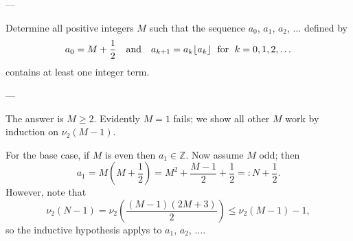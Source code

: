 
---

Determine all positive integers $M$ such that the sequence $a_0$, $a_1$, $a_2$, $\ldots$ defined by
\[a_0=M+\frac12\quad\text{and}\quad a_{k+1}=a_k\lfloor a_k\rfloor\text{ \;for\; }k=0,1,2,\ldots\]
contains at least one integer term.

---

The answer is $M\ge2$. Evidently $M=1$ fails; we show all other $M$ work by induction on $\nu_2(M-1)$.

For the base case, if $M$ is even then $a_1\in\mathbb Z$. Now assume $M$ odd; then \[a_1=M\left(M+\frac12\right)=M^2+\frac{M-1}2+\frac12=:N+\frac12.\]
However, note that \[\nu_2(N-1)=\nu_2\left(\frac{(M-1)(2M+3)}2\right)\le\nu_2(M-1)-1,\]
so the inductive hypothesis applys to $a_1$, $a_2$, $\ldots$.

